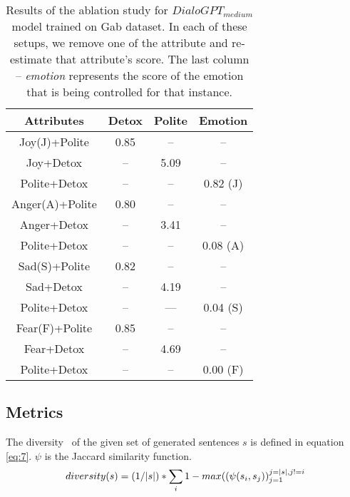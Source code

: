 \begin{table}[!htpb]
\centering
\footnotesize
\begin{tabular}{|c|c|c|c|}
\hline
\textbf{Attributes}          & \textbf{Detox}              & \textbf{Polite}           & \textbf{Emotion} \\ \hline
Joy(J)+Polite    & 0.85                & --                & -- \\ 
Joy+Detox    &  --                  & 5.09              & -- \\ 
Polite+Detox    & --                & --                & 0.82 (J) \\ \hline

Anger(A)+Polite  & 0.80                & --                & --  \\ 
Anger+Detox     & --                & 3.41              & --  \\ 
Polite+Detox     & --                & --               & 0.08 (A)  \\ \hline

Sad(S)+Polite    & 0.82                & --                & -- \\ 
Sad+Detox     &  --                & 4.19                & -- \\ 
Polite+Detox  & --                & ---                & 0.04 (S) \\ \hline

Fear(F)+Polite   & 0.85             & --                & --\\ 
Fear+Detox   & --               & 4.69                & --\\ 
Polite+Detox   & --                & --                & 0.00 (F)\\ \hline

\end{tabular}
\caption{\footnotesize{Results of the ablation study for $DialoGPT_{medium}$ model trained on Gab dataset. In each of these setups, we remove one of the attribute and re-estimate that attribute's score. The last column -- \textit{emotion} represents the score of the emotion that is being controlled for that instance.}}
\label{tab:multi-attribute-ablation-gab}
\end{table}
\subsection{Metrics}
The diversity~\cite{wang2018sentigan} of the given set of generated sentences $s$ is defined in equation  \ref{eq:7}. $\psi$ is the Jaccard similarity function.
\begin{equation}
\footnotesize
\label{eq:7}
diversity(s) =(1/|s|)*\sum_{i}1-max((\psi(s_{i},s_{j}))_{j=1}^{j=|s|,j!=i}
\end{equation}

